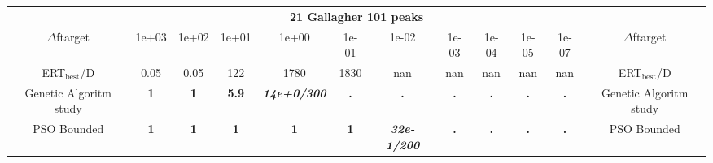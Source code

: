 \begin{tabular}{cccccccccccc}
 & \multicolumn{10}{c}{{\normalsize \textbf{21 Gallagher 101 peaks}}}\\
$\Delta$ftarget& 1e+03& 1e+02& 1e+01& 1e+00& 1e-01& 1e-02& 1e-03& 1e-04& 1e-05& 1e-07 & $\Delta$ftarget \\
ERT$_{\textrm{best}}$/D& 0.05& 0.05& 122& 1780& 1830& nan& nan& nan& nan& nan & ERT$_{\textrm{best}}$/D \\
\hline
Genetic Algoritm study & \textbf{1} & \textbf{1} & \textbf{5.9} & \textbf{\textit{14e+0}\textit{/300}} & \textbf{.} & \textbf{.} & \textbf{.} & \textbf{.} & \textbf{.} & \textbf{.} & Genetic Algoritm study \cite{add_an_entry_for_Genetic Algoritm study_in_bbob.bib}\\
PSO Bounded & \textbf{1} & \textbf{1} & \textbf{1} & \textbf{1} & \textbf{1} & \textbf{\textit{32e-1}\textit{/200}} & \textbf{.} & \textbf{.} & \textbf{.} & \textbf{.} & PSO Bounded \cite{add_an_entry_for_PSO Bounded_in_bbob.bib}
\end{tabular}
